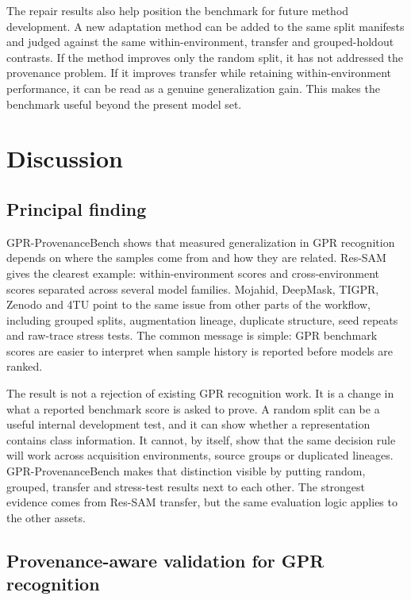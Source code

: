 \documentclass[]{interact}
\begin{document}
The repair results also help position the benchmark for future method development. A new adaptation method can be added to the same split manifests and judged against the same within-environment, transfer and grouped-holdout contrasts. If the method improves only the random split, it has not addressed the provenance problem. If it improves transfer while retaining within-environment performance, it can be read as a genuine generalization gain. This makes the benchmark useful beyond the present model set.

\section{Discussion}

\subsection{Principal finding}

GPR-ProvenanceBench shows that measured generalization in GPR recognition depends on where the samples come from and how they are related. Res-SAM gives the clearest example: within-environment scores and cross-environment scores separated across several model families. Mojahid, DeepMask, TIGPR, Zenodo and 4TU point to the same issue from other parts of the workflow, including grouped splits, augmentation lineage, duplicate structure, seed repeats and raw-trace stress tests. The common message is simple: GPR benchmark scores are easier to interpret when sample history is reported before models are ranked.

The result is not a rejection of existing GPR recognition work. It is a change in what a reported benchmark score is asked to prove. A random split can be a useful internal development test, and it can show whether a representation contains class information. It cannot, by itself, show that the same decision rule will work across acquisition environments, source groups or duplicated lineages. GPR-ProvenanceBench makes that distinction visible by putting random, grouped, transfer and stress-test results next to each other. The strongest evidence comes from Res-SAM transfer, but the same evaluation logic applies to the other assets.

\subsection{Provenance-aware validation for GPR recognition}
\end{document}
